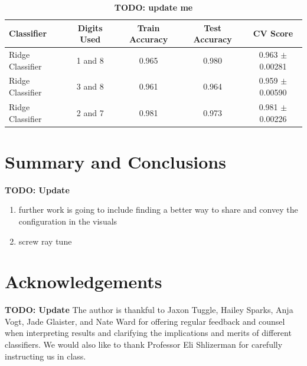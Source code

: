 \documentclass[11pt]{amsart}
\begin{document}
\begin{table}[h]
    \centering
    \begin{tabular}{|l|c|c|c|c|} %
        \hline
        \textbf{Classifier} & \textbf{Digits Used} & \textbf{Train Accuracy} & \textbf{Test Accuracy} & \textbf{CV Score} \\ 
        \hline
        Ridge Classifier & 1 and 8 & 0.965  & 0.980 & 0.963 $\pm$ 0.00281 \\
        \hline
        Ridge Classifier & 3 and 8 & 0.961  & 0.964 & 0.959 $\pm$ 0.00590 \\
        \hline
        Ridge Classifier & 2 and 7 & 0.981  & 0.973 & 0.981 $\pm$ 0.00226 \\  
        \hline
    \end{tabular}
    \caption{\textbf{TODO: update me}}
    \label{tab:tab0}
\end{table}


\section{Summary and Conclusions}\label{sec:conclusions} 
\textbf{TODO: Update}
\begin{enumerate}
\item further work is going to include finding a better way to share and convey the configuration in the visuals
\item screw ray tune
\end{enumerate}

\section*{Acknowledgements}
\textbf{TODO: Update}
The author is thankful to Jaxon Tuggle, Hailey Sparks, Anja Vogt, Jade Glaister, and Nate Ward for offering regular feedback and counsel when interpreting results and clarifying the implications and merits of different classifiers.
We would also like to thank Professor Eli Shlizerman for carefully instructing us in class.


\end{document}
